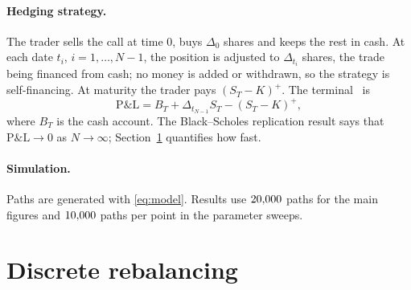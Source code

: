 \documentclass[11pt,a4paper]{article}
\newcommand{\PnL}{\text{P\&L}}
\begin{document}
\paragraph{Hedging strategy.} The trader sells the call at time $0$, buys $\Delta_0$ shares and keeps the rest in cash. At each date $t_i$, $i = 1,\dots,N-1$, the position is adjusted to $\Delta_{t_i}$ shares, the trade being financed from cash; no money is added or withdrawn, so the strategy is self-financing. At maturity the trader pays $(S_T-K)^+$. The terminal \PnL\ is
\[
  \PnL = B_T + \Delta_{t_{N-1}} S_T - (S_T - K)^+ ,
\]
where $B_T$ is the cash account. The Black--Scholes replication result says that $\PnL \to 0$ as $N\to\infty$; Section~\ref{sec:discrete} quantifies how fast.

\paragraph{Simulation.} Paths are generated with \eqref{eq:model}. Results use $20{,}000$ paths for the main figures and $10{,}000$ paths per point in the parameter sweeps.

\section{Discrete rebalancing}\label{sec:discrete}
\end{document}
